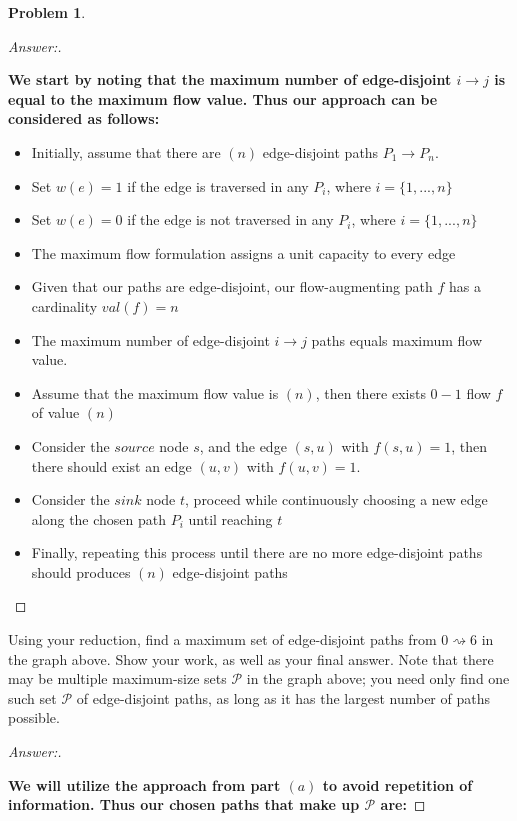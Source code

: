 \documentclass[11pt]{article}
\theoremstyle{definition}
\theoremstyle{definition}
\newtheorem{required}{Problem}
\theoremstyle{definition}
\begin{document}
\begin{required}
\begin{enumerate}[(a)]
\begin{proof}[Answer:] \
\item \textbf{We start by noting that the maximum number of edge-disjoint $i \to j$ is equal to the maximum flow value. Thus our approach can be considered as follows:}

\begin{itemize}
\item Initially, assume that there are $(n)$ edge-disjoint paths $P_1 \to P_n$.
\item Set $w(e) = 1$ if the edge is traversed in any $P_i$, where $i = \{1,...,n\}$
\item Set $w(e) = 0$ if the edge is not traversed in any $P_i$, where $i = \{1,...,n\}$
\item The maximum flow formulation assigns a unit capacity to every edge
\item Given that our paths are edge-disjoint, our flow-augmenting path $f$ has a cardinality $val(f) = n$
\item The maximum number of edge-disjoint $i \to j$ paths equals maximum flow value.
\item Assume that the maximum flow value is $(n)$, then there exists $0 - 1$ flow $f$ of value $(n)$
\item Consider the $source$ node $s$, and the edge $(s, u)$ with $f(s, u) = 1$, then there should exist an edge $(u, v)$ with $f(u, v)=1$.
\item Consider the $sink$ node $t$, proceed while continuously choosing a new edge along the chosen path $P_i$ until reaching $t$
\item Finally, repeating this process until there are no more edge-disjoint paths should produces $(n)$ edge-disjoint paths
\end{itemize}
\end{proof}


\item Using your reduction, find a maximum set of edge-disjoint paths from $0 \rightsquigarrow 6$ in the graph above. Show your work, as well as your final answer. Note that there may be multiple maximum-size sets $\mathcal{P}$ in the graph above; you need only find one such set $\mathcal{P}$ of edge-disjoint paths, as long as it has the largest number of paths possible.

\begin{proof}[Answer:] \
\item \textbf{We will utilize the approach from part $(a)$ to avoid repetition of information. Thus our chosen paths that make up $\mathcal{P}$ are:}


\end{proof}
\end{enumerate}
\end{required}
\end{document}
